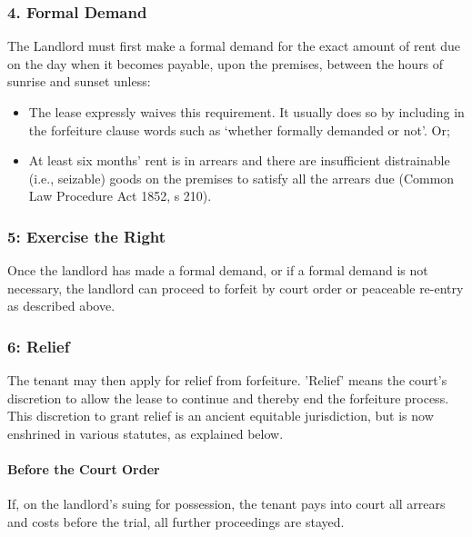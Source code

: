 \documentclass[
]{article}
\providecommand{\tightlist}{%
  \setlength{\itemsep}{0pt}\setlength{\parskip}{0pt}}
\begin{document}
\hypertarget{formal-demand}{%
\subsubsection{4. Formal Demand}\label{formal-demand}}

The Landlord must first make a formal demand for the exact amount of
rent due on the day when it becomes payable, upon the premises, between
the hours of sunrise and sunset unless:

\begin{itemize}
\tightlist
\item
  The lease expressly waives this requirement. It usually does so by
  including in the forfeiture clause words such as `whether formally
  demanded or not'. Or;
\item
  At least six months' rent is in arrears and there are insufficient
  distrainable (i.e., seizable) goods on the premises to satisfy all the
  arrears due (Common Law Procedure Act 1852, s 210).
\end{itemize}

\hypertarget{exercise-the-right}{%
\subsubsection{5: Exercise the Right}\label{exercise-the-right}}

Once the landlord has made a formal demand, or if a formal demand is not
necessary, the landlord can proceed to forfeit by court order or
peaceable re-entry as described above.

\hypertarget{relief}{%
\subsubsection{6: Relief}\label{relief}}

The tenant may then apply for relief from forfeiture. 'Relief' means the
court's discretion to allow the lease to continue and thereby end the
forfeiture process. This discretion to grant relief is an ancient
equitable jurisdiction, but is now enshrined in various statutes, as
explained below.

\hypertarget{before-the-court-order}{%
\paragraph{Before the Court Order}\label{before-the-court-order}}

If, on the landlord's suing for possession, the tenant pays into court
all arrears and costs before the trial, all further proceedings are
stayed.
\end{document}
